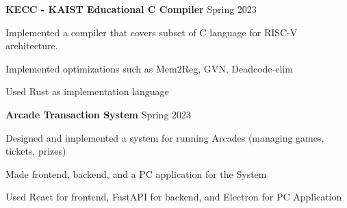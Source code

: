 

\begin{cventries}

  \cvproject
    {\textbf{KECC - KAIST Educational C Compiler}}
    {Spring 2023}
    {
      \begin{cvitems}
          \item {Implemented a compiler that covers subset of C language for RISC-V architecture.}
          \item {Implemented optimizations such as Mem2Reg, GVN, Deadcode-elim}
          \item {Used Rust as implementation language}
      \end{cvitems}
    }
  \cvproject
    {\textbf{Arcade Transaction System}} %
    {Spring 2023} %
    {
      \begin{cvitems} %
        \item {Designed and implemented a system for running Arcades (managing games, tickets, prizes)}
        \item {Made frontend, backend, and a PC application for the System}
        \item {Used React for frontend, FastAPI for backend, and Electron for PC Application}
      \end{cvitems}
    }


\end{cventries}
